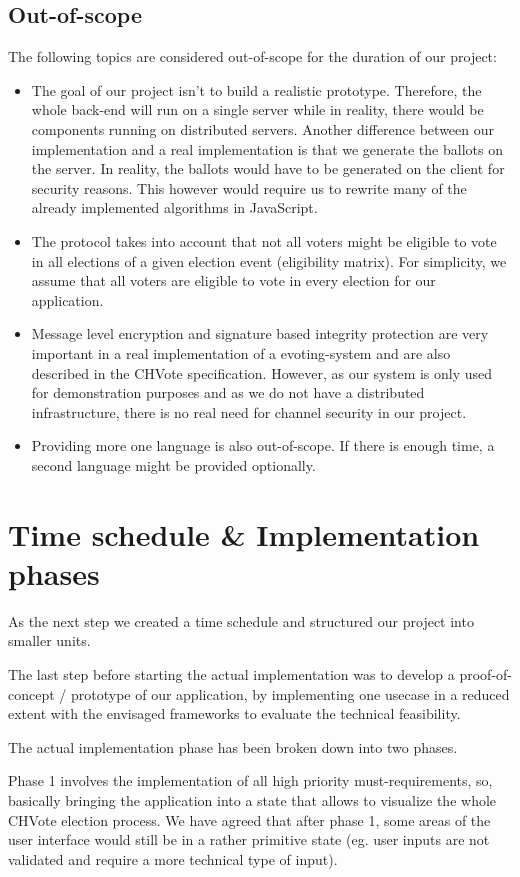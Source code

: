 \subsection{Out-of-scope}
The following topics are considered out-of-scope for the duration of our project:
\begin{itemize}
	\item The goal of our project isn't to build a realistic prototype. Therefore, the whole back-end will run on a single server while in reality, there would be components running on distributed servers. Another difference between our implementation and a real implementation is that we generate the ballots on the server. In reality, the ballots would have to be generated on the client for security reasons. This however would require us to rewrite many of the already implemented algorithms in JavaScript.
	\item The protocol takes into account that not all voters might be eligible to vote in all elections of a given election event (eligibility matrix). For simplicity, we assume that all voters are eligible to vote in every election for our application.
	\item Message level encryption and signature based integrity protection are very important in a real implementation of a evoting-system and are also described in the CHVote specification. However, as our system is only used for demonstration purposes and as we do not have a distributed infrastructure, there is no real need for channel security in our project.	
	\item Providing more one language is also out-of-scope. If there is enough time, a second language might be provided optionally.
\end{itemize}

\section{Time schedule \& Implementation phases}
As the next step we created a time schedule and structured our project into smaller units.

The last step before starting the actual implementation was to develop a proof-of-concept / prototype of our application, by implementing one usecase in a reduced extent with the envisaged frameworks to evaluate the technical feasibility.

The actual implementation phase has been broken down into two phases. 

Phase 1 involves the implementation of all high priority must-requirements, so, basically bringing the application into a state that allows to visualize the whole CHVote election process. We have agreed that after phase 1, some areas of the user interface would still be in a rather primitive state (eg. user inputs are not validated and require a more technical type of input). 

